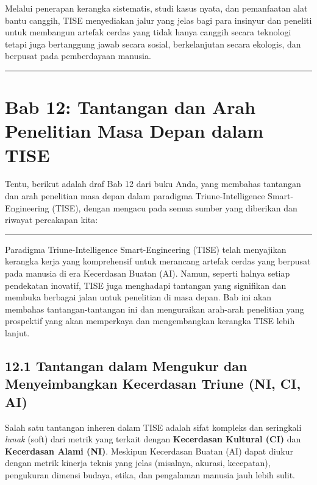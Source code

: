\documentclass[
  letterpaper,
  DIV=11,
  numbers=noendperiod]{scrreprt}
\begin{document}
Melalui penerapan kerangka sistematis, studi kasus nyata, dan
pemanfaatan alat bantu canggih, TISE menyediakan jalur yang jelas bagi
para insinyur dan peneliti untuk membangun artefak cerdas yang tidak
hanya canggih secara teknologi tetapi juga bertanggung jawab secara
sosial, berkelanjutan secara ekologis, dan berpusat pada pemberdayaan
manusia.

\begin{center}\rule{0.5\linewidth}{0.5pt}\end{center}


\chapter{\texorpdfstring{\textbf{Bab 12: Tantangan dan Arah Penelitian
Masa Depan dalam
TISE}}{Bab 12: Tantangan dan Arah Penelitian Masa Depan dalam TISE}}\label{bab-12-tantangan-dan-arah-penelitian-masa-depan-dalam-tise}

Tentu, berikut adalah draf Bab 12 dari buku Anda, yang membahas
tantangan dan arah penelitian masa depan dalam paradigma
Triune-Intelligence Smart-Engineering (TISE), dengan mengacu pada semua
sumber yang diberikan dan riwayat percakapan kita:

\begin{center}\rule{0.5\linewidth}{0.5pt}\end{center}

Paradigma Triune-Intelligence Smart-Engineering (TISE) telah menyajikan
kerangka kerja yang komprehensif untuk merancang artefak cerdas yang
berpusat pada manusia di era Kecerdasan Buatan (AI). Namun, seperti
halnya setiap pendekatan inovatif, TISE juga menghadapi tantangan yang
signifikan dan membuka berbagai jalan untuk penelitian di masa depan.
Bab ini akan membahas tantangan-tantangan ini dan menguraikan arah-arah
penelitian yang prospektif yang akan memperkaya dan mengembangkan
kerangka TISE lebih lanjut.

\section{\texorpdfstring{\textbf{12.1 Tantangan dalam Mengukur dan
Menyeimbangkan Kecerdasan Triune (NI, CI,
AI)}}{12.1 Tantangan dalam Mengukur dan Menyeimbangkan Kecerdasan Triune (NI, CI, AI)}}\label{tantangan-dalam-mengukur-dan-menyeimbangkan-kecerdasan-triune-ni-ci-ai}

Salah satu tantangan inheren dalam TISE adalah sifat kompleks dan
seringkali \emph{lunak} (soft) dari metrik yang terkait dengan
\textbf{Kecerdasan Kultural (CI)} dan \textbf{Kecerdasan Alami (NI)}.
Meskipun Kecerdasan Buatan (AI) dapat diukur dengan metrik kinerja
teknis yang jelas (misalnya, akurasi, kecepatan), pengukuran dimensi
budaya, etika, dan pengalaman manusia jauh lebih sulit.
\end{document}
